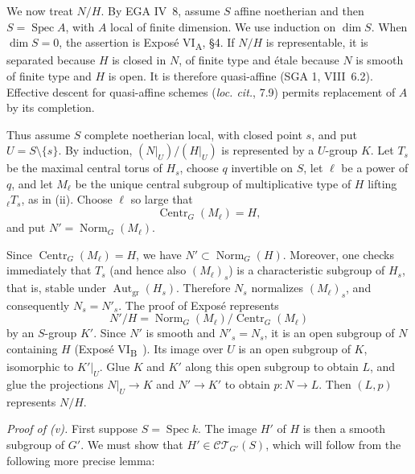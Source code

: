 We now treat \(N/H\). By EGA IV~8, assume \(S\) affine noetherian and
then \(S=\operatorname{Spec}A\), with \(A\) local of finite
dimension. We use induction on
\(\dim S\). When \(\dim S=0\), the assertion is Exposé
VI\textsubscript{A}, §4. If \(N/H\) is representable, it is separated
because \(H\) is closed in \(N\), of finite type and étale because
\(N\) is smooth of finite type and \(H\) is open. It is therefore
quasi-affine (SGA 1, VIII~6.2). Effective descent for quasi-affine
schemes (\emph{loc. cit.}, 7.9) permits replacement of \(A\) by its
completion.

Thus assume \(S\) complete noetherian local, with closed point \(s\),
and put \(U=S\setminus\{s\}\). By induction,
\((N|_U)/(H|_U)\) is represented by a \(U\)-group \(K\). Let \(T_s\)
be the maximal central torus of \(H_s\), choose \(q\) invertible on
\(S\), let \(\ell\) be a power of \(q\), and let \(M_\ell\) be the
unique central subgroup of multiplicative type of \(H\) lifting
\({}_\ell T_s\), as in (ii). Choose \(\ell\) so large that
\[
  \operatorname{Centr}_G(M_\ell)=H,
\]
and put \(N'=\operatorname{Norm}_G(M_\ell)\).

Since \(\operatorname{Centr}_G(M_\ell)=H\), we have
\(N'\subset\operatorname{Norm}_G(H)\). Moreover, one checks immediately that
\(T_s\) (and hence also \((M_\ell)_s\)) is a characteristic subgroup of
\(H_s\), that is, stable under \(\operatorname{Aut}_{\mathrm{gr}}(H_s)\).
Therefore \(N_s\) normalizes \((M_\ell)_s\), and consequently
\(N_s=N'_s\). The proof of Exposé  represents
\[
  N'/H
  =\operatorname{Norm}_G(M_\ell)/
   \operatorname{Centr}_G(M_\ell)
\]
by an \(S\)-group \(K'\). Since \(N'\) is smooth and
\(N'_s=N_s\), it is an open subgroup of \(N\) containing \(H\)
(Exposé VI\textsubscript{B}~). Its image over \(U\) is an open
subgroup of \(K\), isomorphic to \(K'|_U\). Glue \(K\) and \(K'\)
along this open subgroup to obtain \(L\), and glue the projections
\(N|_U\to K\) and \(N'\to K'\) to obtain \(p:N\to L\). Then
\((L,p)\) represents \(N/H\).

\medskip\noindent\textit{Proof of (v).}
First suppose \(S=\operatorname{Spec}k\). The image \(H'\) of \(H\)
is then a smooth subgroup of \(G'\). We must show that
\(H'\in\mathcal{CT}_{G'}(S)\), which will follow from the following more
precise lemma:


